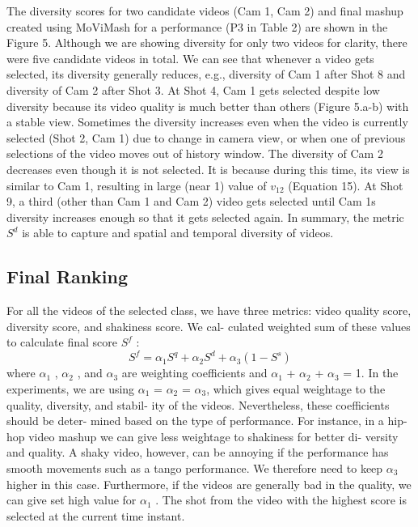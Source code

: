 \documentclass{sig-alternate}
\providecommand{\DIFadd}[1]{{\protect\color{blue}\uwave{#1}}} %
\providecommand{\DIFaddbegin}{} %
\providecommand{\DIFaddend}{} %
\begin{document}
\begin{enumerate}
The diversity scores for two candidate videos (Cam 1, Cam 2)
and final mashup created using MoViMash for a performance (P3
in Table 2) are shown in the Figure 5. Although we are showing
diversity for only two videos for clarity, there were five candidate
videos in total. We can see that whenever a video gets selected,
its diversity generally reduces, e.g., diversity of Cam 1 after Shot 8
and diversity of Cam 2 after Shot 3. At Shot 4, Cam 1 gets selected
despite low diversity because its video quality is much better than
others (Figure 5.a-b) with a stable view. Sometimes the diversity
increases even when the video is currently selected (Shot 2, Cam 1)
due to change in camera view, or when one of previous selections
of the video moves out of history window. The diversity of Cam 2
decreases even though it is not selected. It is because during this
time, its view is similar to Cam 1, resulting in large (near 1) value
of $v_{12}$ (Equation 15). At Shot 9, a third (other than Cam 1 and Cam
2) video gets selected until Cam 1s diversity increases enough so
that it gets selected again. In summary, the metric $S^d$ is able to
capture and spatial and temporal diversity of videos.
 \end{enumerate} 

\subsection{Final Ranking}
\DIFaddbegin \DIFadd{I am a new sentence.
}\DIFaddend For all the videos of the selected class, we have three metrics:
video quality score, diversity score, and shakiness score. We cal-
culated weighted sum of these values to calculate final score $S^f$ :
\[S^f = \alpha_1 S^q + \alpha_2 S^d +\alpha_3(1 - S^s)\tag{17}\]
where $\alpha_1$ , $\alpha_2$ , and $\alpha_3$ are weighting coefficients and $\alpha_1$ + $\alpha_2$ +
$\alpha_3$ = 1. In the experiments, we are using $\alpha_1$ = $\alpha_2$ = $\alpha_3$,
which gives equal weightage to the quality, diversity, and stabil-
ity of the videos. Nevertheless, these coefficients should be deter-
mined based on the type of performance. For instance, in a hip-hop
video mashup we can give less weightage to shakiness for better di-
versity and quality. A shaky video, however, can be annoying if the
performance has smooth movements such as a tango performance.
We therefore need to keep $\alpha_3$ higher in this case. Furthermore, if
the videos are generally bad in the quality, we can give set high
value for $\alpha_1$ . The shot from the video with the highest score is
selected at the current time instant.
\end{document}
